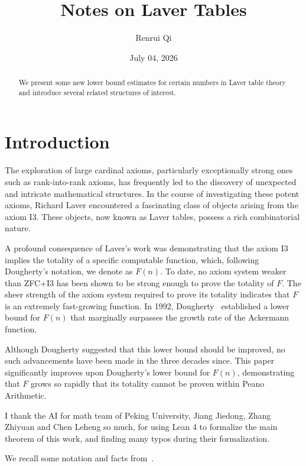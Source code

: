 \documentclass{article}
\theoremstyle{definition}
\theoremstyle{remark}
\begin{document}
\title{Notes on Laver Tables}
\author{Renrui Qi}
\date{July 04, 2026}
\maketitle
\setlength{\parindent}{10pt}

\begin{abstract}
    We present some new lower bound estimates for certain numbers in Laver table theory and introduce several related structures of interest.
\end{abstract}

\section{Introduction}

The exploration of large cardinal axioms, particularly exceptionally strong ones such as rank-into-rank axioms, has frequently led to the discovery of unexpected and intricate mathematical structures. In the course of investigating these potent axioms, Richard Laver encountered a fascinating class of objects arising from the axiom I3. These objects, now known as Laver tables, possess a rich combinatorial nature. 


A profound consequence of Laver's work was demonstrating that the axiom I3 implies the totality of a specific computable function, which, following Dougherty's notation, we denote as $F(n)$. To date, no axiom system weaker than ZFC+I3 has been shown to be strong enough to prove the totality of $F$. The sheer strength of the axiom system required to prove its totality indicates that $F$ is an extremely fast-growing function. In 1992, Dougherty~\cite{Dougherty} established a lower bound for $F(n)$ that marginally surpasses the growth rate of the Ackermann function. 

Although Dougherty suggested that this lower bound should be improved, no such advancements have been made in the three decades since. This paper significantly improves upon Dougherty's lower bound for $F(n)$, demonstrating that $F$ grows so rapidly that its totality cannot be proven within Peano Arithmetic.

I thank the AI for math team of Peking University, Jiang Jiedong, Zhang Zhiyuan and Chen Leheng so much, for using Lean 4 to formalize the main theorem of this work, and finding many typos during their formalization.


\medskip

We recall some notation and facts from~\cite{Dougherty}.  
\end{document}
